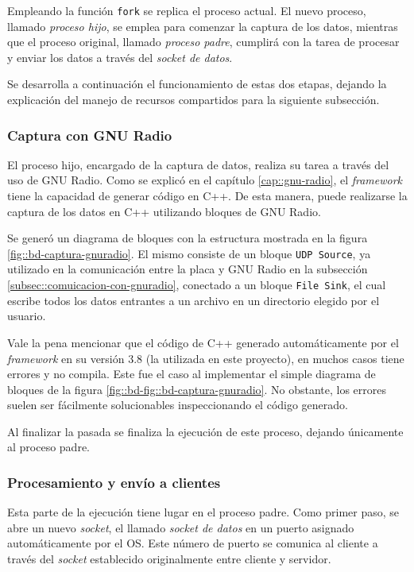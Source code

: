 \documentclass[../../main.tex]{subfiles}
\begin{document}
Empleando la función \texttt{fork} se replica el proceso actual. El nuevo proceso, llamado \textit{proceso hijo}, se emplea para comenzar la captura de los datos, mientras que el proceso original, llamado \textit{proceso padre}, cumplirá con la tarea de procesar y enviar los datos a través del \textit{socket de datos}.

Se desarrolla a continuación el funcionamiento de estas dos etapas, dejando la explicación del manejo de recursos compartidos para la siguiente subsección.

\subsubsection{Captura con GNU Radio}
El proceso hijo, encargado de la captura de datos, realiza su tarea a través del uso de GNU Radio. Como se explicó en el capítulo \ref{cap::gnu-radio}, el \textit{framework} tiene la capacidad de generar código en C++. De esta manera, puede realizarse la captura de los datos en C++ utilizando bloques de GNU Radio.

Se generó un diagrama de bloques con la estructura mostrada en la figura \ref{fig::bd-captura-gnuradio}. El mismo consiste de un bloque \texttt{UDP Source}, ya utilizado en la comunicación entre la placa y GNU Radio en la subsección \ref{subsec::comuicacion-con-gnuradio}, conectado a un bloque \texttt{File Sink}, el cual escribe todos los datos entrantes a un archivo en un directorio elegido por el usuario.

Vale la pena mencionar que el código de C++ generado automáticamente por el \textit{framework} en su versión 3.8 (la utilizada en este proyecto), en muchos casos tiene errores y no compila. Este fue el caso al implementar el simple diagrama de bloques de la figura \ref{fig::bd-fig::bd-captura-gnuradio}. No obstante, los errores suelen ser fácilmente solucionables inspeccionando el código generado.


Al finalizar la pasada se finaliza la ejecución de este proceso, dejando únicamente al proceso padre. 

\subsubsection{Procesamiento y envío a clientes}
Esta parte de la ejecución tiene lugar en el proceso padre. Como primer paso, se abre un nuevo \textit{socket}, el llamado \textit{socket de datos} en un puerto asignado automáticamente por el OS. Este número de puerto se comunica al cliente a través del \textit{socket} establecido originalmente entre cliente y servidor.
\end{document}
